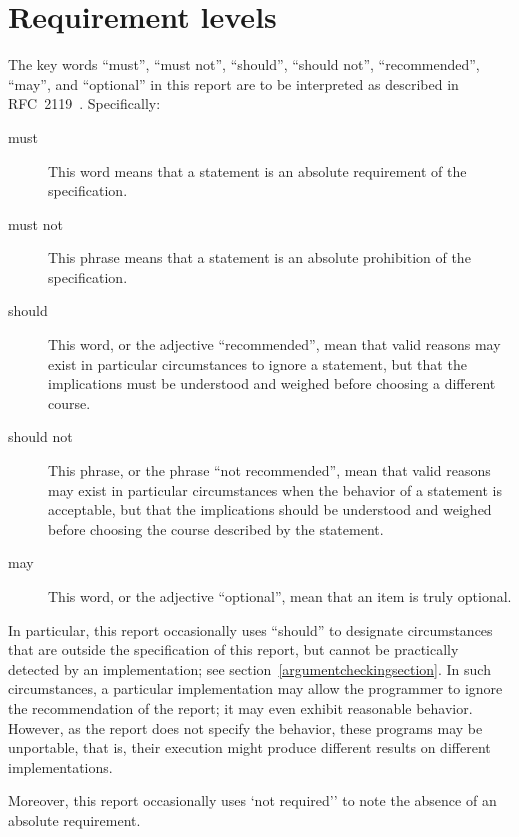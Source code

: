\chapter{Requirement levels} 
\label{requirementchapter}

The key words ``must'', ``must not'', ``should'',
``should not'', ``recommended'', ``may'', and ``optional'' in this
report are to be interpreted as described in RFC~2119~\cite{mustard}.
Specifically:

\begin{description}
\item[must] This word means that a statement is an absolute
  requirement of the specification.
\item[must not] This phrase means that a statement is an absolute
  prohibition of the specification.
\item[should] This word, or the adjective ``recommended'', mean that
  valid reasons may exist in particular circumstances to ignore a
  statement, but that the implications must be understood and weighed
  before choosing a different course.
\item[should not] This phrase, or the phrase ``not recommended'', mean
  that valid reasons may exist in particular circumstances when the
  behavior of a statement is acceptable, but that the implications
  should be understood and weighed before choosing the course described
  by the statement.
\item[may] This word, or the adjective ``optional'', mean that an item
  is truly optional.
\end{description}

In particular, this report occasionally uses ``should'' to designate
circumstances that are outside the specification of this report, but
cannot be practically detected by an implementation; see
section~\ref{argumentcheckingsection}.  In such circumstances, a
particular implementation may allow the programmer to ignore the
recommendation of the report; it may even exhibit reasonable behavior.
However, as the report does not specify the behavior,
these programs may be unportable, that is, their execution might
produce different results on different implementations.

Moreover, this report occasionally uses `not required'' to note the
absence of an absolute requirement.

